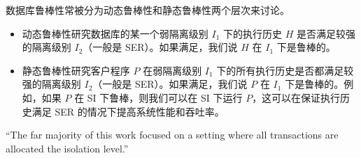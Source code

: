 
\begin{frame}{}
	数据库鲁棒性常被分为动态鲁棒性和静态鲁棒性两个层次来讨论。

	\begin{itemize}
		\item 动态鲁棒性研究数据库的某一个弱隔离级别 $I_1$ 下的执行历史 $H$ 是否满足较强的隔离级别 $I_2$（一般是 SER）。如果满足，我们说 $H$ 在 $I_1$ 下是鲁棒的。
		\item 静态鲁棒性研究客户程序 $P$ 在弱隔离级别 $I_1$ 下的所有执行历史是否都满足较强的隔离级别 $I_2$（一般是 SER）。如果满足，我们说 $P$ 在 $I_1$ 下是鲁棒的。例如，如果 $P$ 在 SI 下鲁棒，则我们可以在 SI 下运行 $P$，这可以在保证执行历史满足 SER 的情况下提高系统性能和吞吐率。
	\end{itemize}
\end{frame}

\begin{frame}{}
	

	\pause
	\vspace{0.30cm}
	``The far majority of this work focused on
	  a  setting
		where all transactions are allocated
		the  isolation level.''
\end{frame}



